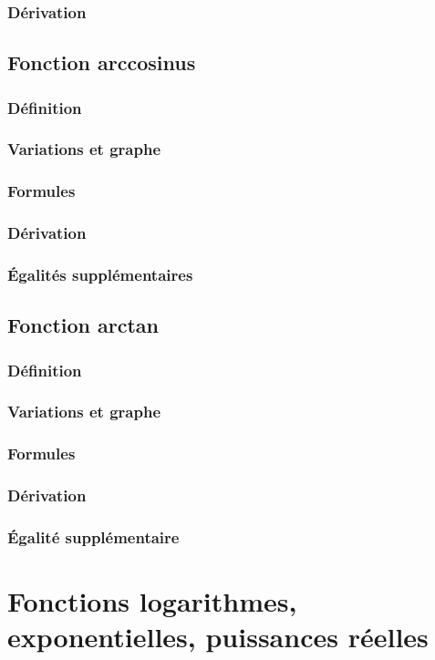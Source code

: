 \documentclass[12pt,a4paper,french]{book}
\begin{document}
		\subsection{Dérivation}
	\section{Fonction arccosinus}
		\subsection{Définition}
		\subsection{Variations et graphe}
		\subsection{Formules}
		\subsection{Dérivation}
		\subsection{Égalités supplémentaires}
	\section{Fonction arctan}
		\subsection{Définition}
		\subsection{Variations et graphe}
		\subsection{Formules}
		\subsection{Dérivation}
		\subsection{Égalité supplémentaire}

\chapter{Fonctions logarithmes, exponentielles, puissances réelles}
\end{document}
